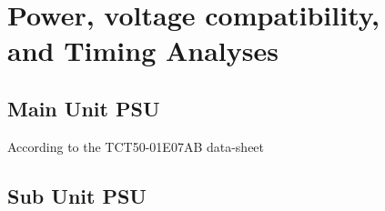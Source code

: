 \section{Power, voltage compatibility,\\ and Timing Analyses}
\subsection{Main Unit PSU}
According to the TCT50-01E07AB data-sheet \cite{TCT5001E07AB}
\subsection{Sub Unit PSU}
